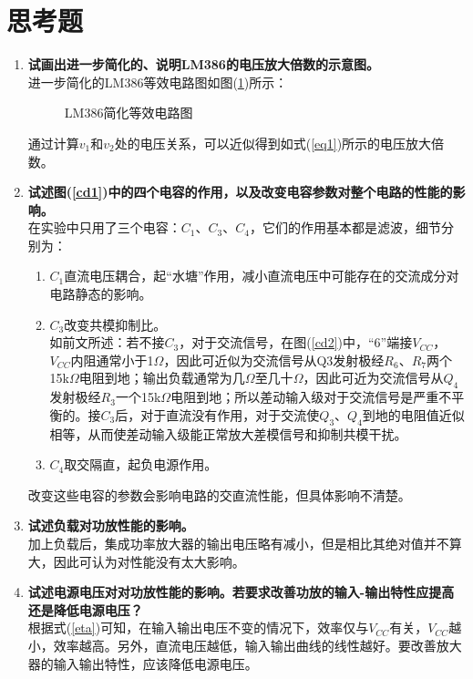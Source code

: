 \documentclass[a4paper]{article}
\begin{document}
\section{思考题}
\begin{enumerate}
\item \textbf{试画出进一步简化的、说明LM386的电压放大倍数的示意图。}\\
进一步简化的LM386等效电路图如图(\ref{LM386s})所示：
\begin{figure}[!h]
\centering
{}
\caption{LM386简化等效电路图}\label{LM386s}
\end{figure}

通过计算$v_1$和$v_2$处的电压关系，可以近似得到如式(\ref{eq1})所示的电压放大倍数。
\item \textbf{试述图(\ref{cd1})中的四个电容的作用，以及改变电容参数对整个电路的性能的影响。}\\
在实验中只用了三个电容：$C_1$、$C_3$、$C_4$，它们的作用基本都是滤波，细节分别为：
\begin{enumerate}
\item $C_1$直流电压耦合，起“水塘”作用，减小直流电压中可能存在的交流成分对电路静态的影响。
\item $C_3$改变共模抑制比。\\
如前文所述：若不接$C_3$，对于交流信号，在图(\ref{cd2})中，“6”端接$V_{CC}$，$V_{CC}$内阻通常小于1$\Omega$，因此可近似为交流信号从Q3发射极经$R_6$、$R_7$两个15k$\Omega$电阻到地；输出负载通常为几$\Omega$至几十$\Omega$，因此可近为交流信号从$Q_4$发射极经$R_3$一个15k$\Omega$电阻到地；所以差动输入级对于交流信号是严重不平衡的。接$C_3$后，对于直流没有作用，对于交流使$Q_3$、$Q_4$到地的电阻值近似相等，从而使差动输入级能正常放大差模信号和抑制共模干扰。
\item $C_4$取交隔直，起负电源作用。
\end{enumerate}
改变这些电容的参数会影响电路的交直流性能，但具体影响不清楚。
\item \textbf{试述负载对功放性能的影响。}\\
加上负载后，集成功率放大器的输出电压略有减小，但是相比其绝对值并不算大，因此可认为对性能没有太大影响。
\item \textbf{试述电源电压对对功放性能的影响。若要求改善功放的输入-输出特性应提高还是降低电源电压？}\\
根据式(\ref{eta})可知，在输入输出电压不变的情况下，效率仅与$V_{CC}$有关，$V_{CC}$越小，效率越高。另外，直流电压越低，输入输出曲线的线性越好。要改善放大器的输入输出特性，应该降低电源电压。
\end{enumerate}

\nocite{jiaocai}

\end{document}
